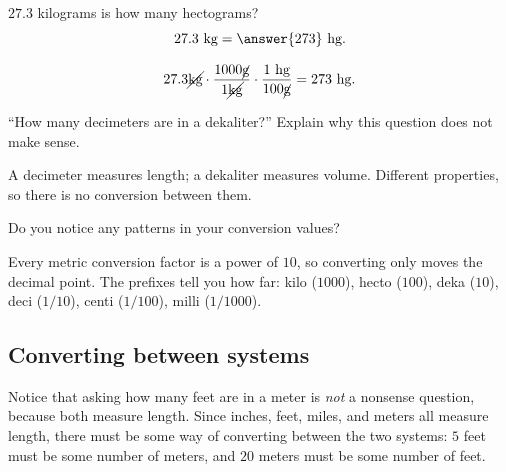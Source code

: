 \documentclass[12pt]{ximera}
\begin{document}
\begin{problem}
$27.3$ kilograms is how many hectograms?
\[
27.3 \text{ kg} = \answer{273} \text{ hg}.
\]

\begin{solution}
\[
27.3 \cancel{\text{kg}} \cdot \frac{1000 \cancel{\text{g}}}{1 \cancel{\text{kg}}}
\cdot \frac{1 \text{ hg}}{100 \cancel{\text{g}}} = 273 \text{ hg}.
\]
\end{solution}
\end{problem}

\begin{problem}
``How many decimeters are in a dekaliter?'' Explain why this question does not make sense.

\begin{freeResponse}
\end{freeResponse}

\begin{solution}
A decimeter measures length; a dekaliter measures volume. Different properties, so
there is no conversion between them.
\end{solution}
\end{problem}

\begin{problem}
Do you notice any patterns in your conversion values?

\begin{freeResponse}
\end{freeResponse}

\begin{solution}
Every metric conversion factor is a power of $10$, so converting only moves the
decimal point. The prefixes tell you how far: kilo ($1000$), hecto ($100$),
deka ($10$), deci ($1/10$), centi ($1/100$), milli ($1/1000$).
\end{solution}
\end{problem}

\subsection*{Converting between systems}

Notice that asking how many feet are in a meter is \emph{not} a nonsense question,
because both measure length. Since inches, feet, miles, and meters all measure
length, there must be some way of converting between the two systems: $5$ feet must
be some number of meters, and $20$ meters must be some number of feet.
\end{document}
